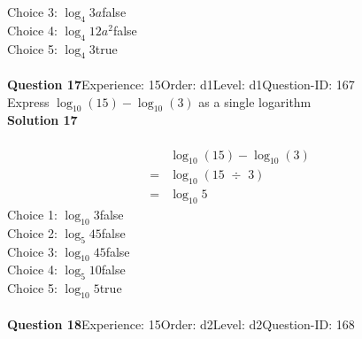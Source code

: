 \documentclass{article}
\begin{document}
Choice 3: \hspace{20pt}$\log_{4}3a$\hspace{20pt}false\\
Choice 4: \hspace{20pt}$\log_{4}12a^2$\hspace{20pt}false\\
Choice 5: \hspace{20pt}$\log_{4}3$\hspace{20pt}true\\
\\[4pt]
\noindent\textbf{Question 17}\hspace{20pt}Experience: 15\hspace{20pt}Order: d1\hspace{20pt}Level: d1\hspace{20pt}Question-ID: 167\\[2pt]
Express $\log_{10}(15)-\log_{10}(3)$ as a single logarithm\\[4pt]
\noindent\textbf{Solution 17}\\[2pt]
\\[-35pt]\begin{align*}
&\log_{10}(15)-\log_{10}(3)\\[2pt]
=&\log_{10}(15 \,\, \div \,\, 3)\\[2pt]
=&\log_{10}5
\end{align*}
Choice 1: \hspace{20pt}$\log_{10}3$\hspace{20pt}false\\
Choice 2: \hspace{20pt}$\log_{5}45$\hspace{20pt}false\\
Choice 3: \hspace{20pt}$\log_{10}45$\hspace{20pt}false\\
Choice 4: \hspace{20pt}$\log_{5}10$\hspace{20pt}false\\
Choice 5: \hspace{20pt}$\log_{10}5$\hspace{20pt}true\\
\\[4pt]
\noindent\textbf{Question 18}\hspace{20pt}Experience: 15\hspace{20pt}Order: d2\hspace{20pt}Level: d2\hspace{20pt}Question-ID: 168\\[2pt]
\end{document}
